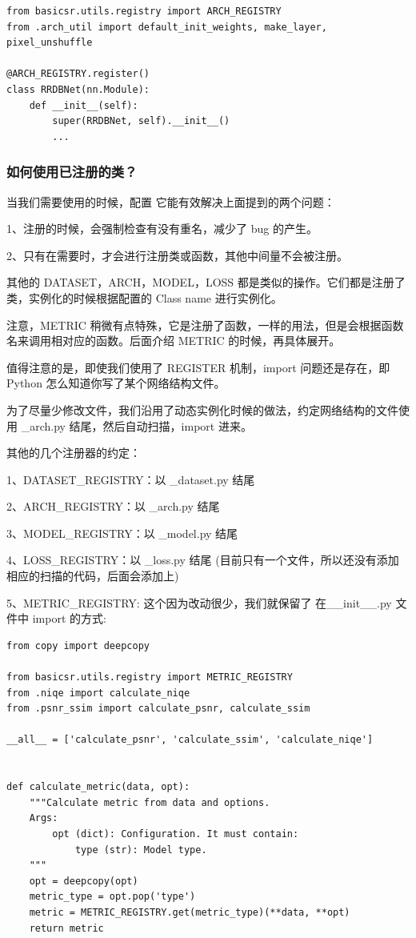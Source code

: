 \documentclass[../main.tex]{subfiles}
\begin{document}
\begin{verbatim}
from basicsr.utils.registry import ARCH_REGISTRY
from .arch_util import default_init_weights, make_layer, pixel_unshuffle

@ARCH_REGISTRY.register()
class RRDBNet(nn.Module):
    def __init__(self):
        super(RRDBNet, self).__init__()
        ...
\end{verbatim}



\subsubsection{如何使用已注册的类？}

当我们需要使用的时候，配置
它能有效解决上面提到的两个问题：

1、注册的时候，会强制检查有没有重名，减少了 bug 的产生。

2、只有在需要时，才会进行注册类或函数，其他中间量不会被注册。





其他的 DATASET，ARCH，MODEL，LOSS 都是类似的操作。它们都是注册了类，实例化的时候根据配置的 Class name 进行实例化。

注意，METRIC 稍微有点特殊，它是注册了函数，一样的用法，但是会根据函数名来调用相对应的函数。后面介绍 METRIC 的时候，再具体展开。

值得注意的是，即使我们使用了 REGISTER 机制，import 问题还是存在，即 Python 怎么知道你写了某个网络结构文件。

为了尽量少修改文件，我们沿用了动态实例化时候的做法，约定网络结构的文件使用  \_arch.py 结尾，然后自动扫描，import 进来。

其他的几个注册器的约定：

1、DATASET\_REGISTRY：以 \_dataset.py 结尾

2、ARCH\_REGISTRY：以 \_arch.py 结尾

3、MODEL\_REGISTRY：以 \_model.py 结尾

4、LOSS\_REGISTRY：以 \_loss.py 结尾 (目前只有一个文件，所以还没有添加相应的扫描的代码，后面会添加上)

5、METRIC\_REGISTRY: 这个因为改动很少，我们就保留了 在\_\_init\_\_.py 文件中 import 的方式:
\begin{verbatim}
from copy import deepcopy

from basicsr.utils.registry import METRIC_REGISTRY
from .niqe import calculate_niqe
from .psnr_ssim import calculate_psnr, calculate_ssim

__all__ = ['calculate_psnr', 'calculate_ssim', 'calculate_niqe']


def calculate_metric(data, opt):
    """Calculate metric from data and options.
    Args:
        opt (dict): Configuration. It must contain:
            type (str): Model type.
    """
    opt = deepcopy(opt)
    metric_type = opt.pop('type')
    metric = METRIC_REGISTRY.get(metric_type)(**data, **opt)
    return metric
\end{verbatim}
\end{document}
